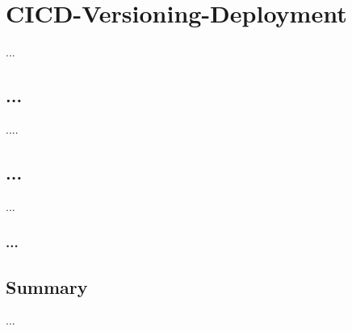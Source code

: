 \chapter{CICD-Versioning-Deployment}
\label{cicd-versioning-deployment}

...
\section{...}
....


\section{...}
...


\subsection{...}


\section{Summary}
...


			
			
			
			
			
			
			
		
	



